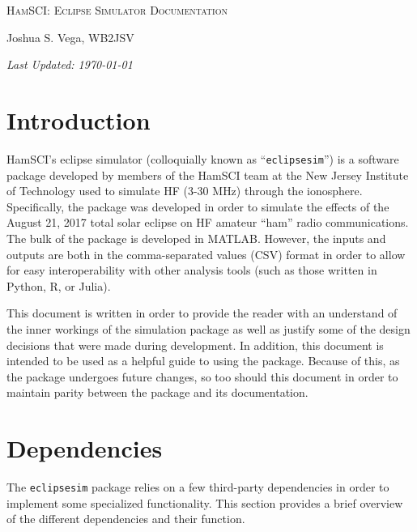 \documentclass[12pt,letterpaper]{article}
\begin{document}
\begin{center}
  {\scshape\Large HamSCI: Eclipse Simulator Documentation\par}
  \vspace{1em}
  {\large Joshua S. Vega, WB2JSV\par}
  \vspace{1em}
  {\itshape\large Last Updated: \today\par}
\end{center}

\tableofcontents

\newpage

%
%
\section{Introduction}
\label{sec:introduction}

HamSCI's eclipse simulator (colloquially known as ``\texttt{eclipsesim}'') is a
software package developed by members of the HamSCI team at the New Jersey
Institute of Technology used to simulate HF (3-30 $\si{\mega\hertz}$) through
the ionosphere. Specifically, the package was developed in order to simulate the
effects of the August 21, 2017 total solar eclipse on HF amateur ``ham'' radio
communications. The bulk of the package is developed in MATLAB. However, the
inputs and outputs are both in the comma-separated values (CSV) format in order
to allow for easy interoperability with other analysis tools (such as those
written in Python, R, or Julia).

This document is written in order to provide the reader with an understand of
the inner workings of the simulation package as well as justify some of the
design decisions that were made during development. In addition, this document
is intended to be used as a helpful guide to using the package. Because of this,
as the package undergoes future changes, so too should this document in order to
maintain parity between the package and its documentation.

%
%
\section{Dependencies}
\label{sec:dependencies}

The \texttt{eclipsesim} package relies on a few third-party dependencies in
order to implement some specialized functionality. This section provides a brief
overview of the different dependencies and their function.
\end{document}
